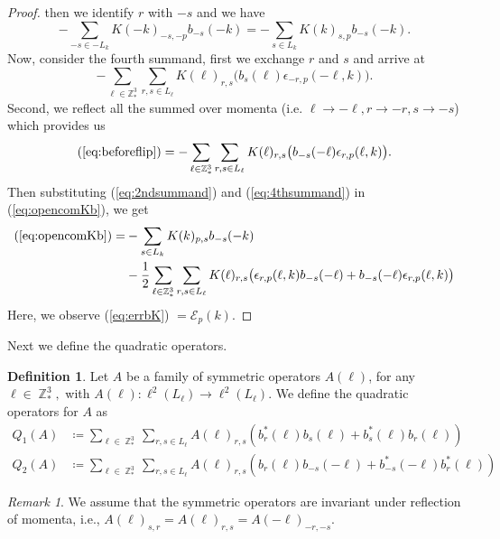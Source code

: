 \documentclass[sn-mathphys, Numbered ,a4paper]{sn-jnl}%
\DeclareMathOperator{\Z}{\mathbb{Z}}
\newcommand{\half}{\frac{1}{2}}
\theoremstyle{plain}
\theoremstyle{definition}
\newtheorem{definition}[theorem]{Definition}
\theoremstyle{remark}
\newtheorem{remark}[theorem]{Remark}
\theoremstyle{plain}
\theoremstyle{definition}
\theoremstyle{remark}
\begin{document}
\begin{proof}
   then we identify $r$ with $-s$ and we have
   \begin{equation}\label{eq:2ndsummand}
        - \sum\limits_{-s\in -L_{k}}K(-k)_{-s,-p}b_{-s}(-k) =- \sum\limits_{s\in L_{k}}K(k)_{s,p}b_{-s}(-k) .
   \end{equation}
   Now, consider the fourth summand, first we exchange $r$ and $s$ and arrive at
   \begin{equation}\label{eq:beforeflip}
       - \sum\limits_{\ell\in \mathbb{Z}^3_*}\sum\limits_{r,s\in L_\ell}K(\ell)_{r,s}\big(b_{s}(\ell)\epsilon_{-r,p}(-\ell,k)\big).
   \end{equation}
   Second, we reflect all the summed over momenta (i.e. $\ell\rightarrow-\ell, r\rightarrow-r, s\rightarrow-s$) which provides us
   \begin{equation}\label{eq:4thsummand}
       (\ref{eq:beforeflip}) = - \sum\limits_{\ell\in \mathbb{Z}^3_*}\sum\limits_{r,s\in L_\ell}K(\ell)_{r,s}\big(b_{-s}(-\ell)\epsilon_{r,p}(\ell,k)\big).
   \end{equation}
   Then substituting (\ref{eq:2ndsummand}) and (\ref{eq:4thsummand}) in (\ref{eq:opencomKb}), we get
   \begin{align}
       (\ref{eq:opencomKb})=&-\sum\limits_{s\in L_k}K(k)_{p,s}b_{-s}(-k)  \nonumber\\
      &- \half\sum\limits_{\ell\in \mathbb{Z}^3_*}\sum\limits_{r,s\in L_\ell}K(\ell)_{r,s}\big(\epsilon_{r,p}(\ell,k)b_{-s}(-\ell)+b_{-s}(-\ell)\epsilon_{r,p}(\ell,k)\big)\label{eq:errbK}
   \end{align}
   Here, we observe (\ref{eq:errbK}) $=  \mathcal{E}_{p}(k) $.
\end{proof}
Next we define the quadratic operators.\newline
\begin{definition}
Let $A$ be a family of symmetric operators $A(\ell)$, for any $ \ell \in \Z^3_*,$ with $A(\ell): \ell^2(L_\ell)\rightarrow\ell^2(L_\ell)$. We define the quadratic operators for $A$ as
\begin{align} 
    Q_1(A)&\coloneq  \sum\limits_{\ell \in \Z^3_*}\sum\limits_{r,s \in L_{\ell}}A(\ell)_{r,s} \left(b^*_r(\ell)b_{s}(\ell)+b^*_{s}(\ell)b_{r}(\ell)\right)\label{eq:Q1}\\ 
    Q_2(A)&\coloneq  \sum\limits_{\ell \in \Z^3_*}\sum\limits_{r,s \in L_{\ell}}A(\ell)_{r,s} \left(b_r(\ell)b_{-s}(-\ell)+b^*_{-s}(-\ell)b^*_{r}(\ell)\right)\label{eq:Q2}
\end{align}
\begin{remark}
 We assume that the symmetric operators are invariant under reflection of momenta, i.e., $A(\ell)_{s,r} = A(\ell)_{r,s} = A(-\ell)_{-r,-s}.$\newline
\end{remark}

\end{definition}
\end{document}

